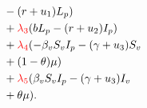 \begin{frame}[plain]
{\begin{textblock*}{55mm}
\begin{greenbox}{}
\begin{align*}
                        &-(r + u_1)L_p)\\
                        &+\textcolor{colComments}{\lambda_3}(b
                         L_p - (r + u_2) 
                        I_p
                        )\\
                        &+\textcolor{colComments}{\lambda_4}(-\beta_v
                         S_v I_p - 
                        (\gamma+u_3) S_v\\ &+(1-\theta)\mu)
                        \\
                        &+\textcolor{colComments}{\lambda_5}(\beta_v
                         S_v I_p 
                        -(\gamma+u_3) I_v
                        \\
                        & +\theta\mu).
                \end{align*}
            \end{greenbox}
        \end{textblock*}
    }
\end{frame}%

